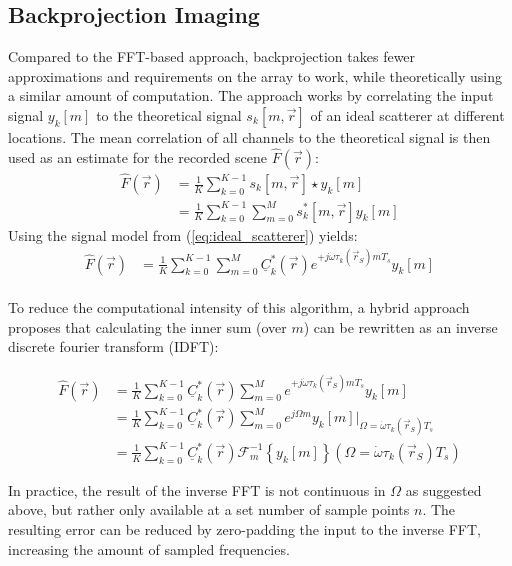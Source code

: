 \subsection{Backprojection Imaging}
\label{sec:bp_imaging_theory}
Compared to the FFT-based approach, backprojection takes fewer approximations and requirements on the array to work,
while theoretically using a similar amount of computation.
The approach works by correlating the input signal $y_k[m]$
to the theoretical signal $s_k[m, \vec r]$ of an ideal scatterer at different locations.
The mean correlation of all channels to the theoretical signal is then used as an estimate for the recorded scene $\hat F(\vec r)$:
\begin{align}
    \hat F(\vec r) & = \frac{1}{K} \sum_{k=0}^{K-1} s_k[m, \vec r] \star y_k[m]             \\
                   & = \frac{1}{K}\sum_{k=0}^{K-1}\sum_{m=0}^{M} s_k^\ast[m, \vec r] y_k[m]
\end{align}
Using the signal model from (\ref*{eq:ideal_scatterer}) yields:
\begin{align}
    \hat F(\vec r) & = \frac{1}{K}\sum_{k=0}^{K-1}\sum_{m=0}^{M}
    \underline C_k^\ast(\vec r)e^{+j\dot\omega\tau_k(\vec r_S)mT_s} y_k[m]
\end{align} \\

To reduce the computational intensity of this algorithm,
a hybrid approach\cite{realtime_bp} proposes that
calculating the inner sum (over $m$) can be rewritten as an inverse discrete fourier transform (IDFT):

\begin{align}
    \hat F(\vec r) & = \frac{1}{K}\sum_{k=0}^{K-1}\underline C_k^\ast(\vec r)
    \sum_{m=0}^{M} e^{+j\dot\omega\tau_k(\vec r_S)mT_s} y_k[m]                \\
                   & = \frac{1}{K}\sum_{k=0}^{K-1}\underline C_k^\ast(\vec r)
    \sum_{m=0}^{M} e^{j\Omega m} y_k[m]
    \Big|_{\Omega=\dot\omega\tau_k(\vec r_S)T_s}                              \\
                   & = \frac{1}{K}\sum_{k=0}^{K-1}\underline C_k^\ast(\vec r)
    \mathcal{F}_m^{-1} \left\{ y_k[m]\right\}(\Omega=\dot\omega\tau_k(\vec r_S)T_s)
\end{align}

In practice, the result of the inverse FFT is not continuous in $\Omega$ as suggested above,
but rather only available at a set number of sample points $n$.
The resulting error can be reduced by zero-padding the input to the inverse FFT,
increasing the amount of sampled frequencies.

